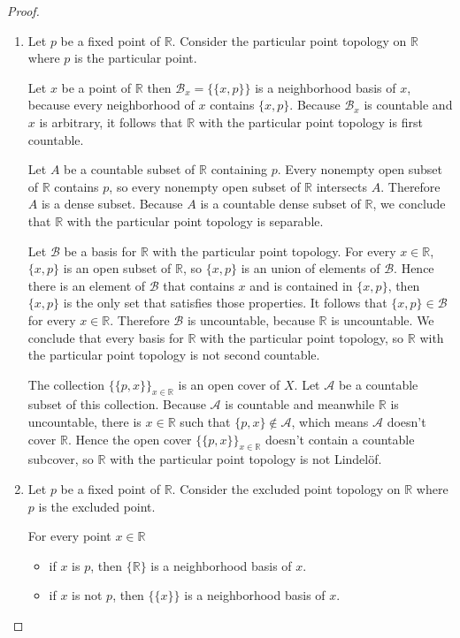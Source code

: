 \begin{proof}
	\begin{enumerate}[label={(\alph*)}]
		\item Let $p$ be a fixed point of $\mathbb{R}$. Consider the particular point topology on $\mathbb{R}$ where $p$ is the particular point.

		      Let $x$ be a point of $\mathbb{R}$ then $\mathscr{B}_{x} = \{ \{ x, p \} \}$ is a neighborhood basis of $x$, because every neighborhood of $x$ contains $\{ x, p \}$. Because $\mathscr{B}_{x}$ is countable and $x$ is arbitrary, it follows that $\mathbb{R}$ with the particular point topology is first countable.

		      Let $A$ be a countable subset of $\mathbb{R}$ containing $p$. Every nonempty open subset of $\mathbb{R}$ contains $p$, so every nonempty open subset of $\mathbb{R}$ intersects $A$. Therefore $A$ is a dense subset. Because $A$ is a countable dense subset of $\mathbb{R}$, we conclude that $\mathbb{R}$ with the particular point topology is separable.

		      Let $\mathscr{B}$ be a basis for $\mathbb{R}$ with the particular point topology. For every $x\in\mathbb{R}$, $\{ x, p \}$ is an open subset of $\mathbb{R}$, so $\{ x, p \}$ is an union of elements of $\mathscr{B}$. Hence there is an element of $\mathscr{B}$ that contains $x$ and is contained in $\{
			      x, p \}$, then $\{ x, p \}$ is the only set that satisfies those properties. It follows that $\{ x, p \}\in\mathscr{B}$ for every $x\in\mathbb{R}$. Therefore $\mathscr{B}$ is uncountable, because $\mathbb{R}$ is uncountable. We conclude that every basis for $\mathbb{R}$ with the particular point topology, so  $\mathbb{R}$ with the particular point topology is not second countable.

		      The collection ${\{ \{ p, x \} \}}_{x\in\mathbb{R}}$ is an open cover of $X$. Let $\mathscr{A}$ be a countable subset of this collection. Because $\mathscr{A}$ is countable and meanwhile $\mathbb{R}$ is uncountable, there is $x\in\mathbb{R}$ such that $\{ p, x \}\notin \mathscr{A}$, which means $\mathscr{A}$ doesn't cover $\mathbb{R}$. Hence the open cover ${\{ \{ p, x \} \}}_{x\in\mathbb{R}}$ doesn't contain a countable subcover, so $\mathbb{R}$ with the particular point topology is not Lindelöf.
		\item Let $p$ be a fixed point of $\mathbb{R}$. Consider the excluded point topology on $\mathbb{R}$ where $p$ is the excluded point.

		      For every point $x\in\mathbb{R}$
		      \begin{itemize}
			      \item if $x$ is $p$, then $\{ \mathbb{R} \}$ is a neighborhood basis of $x$.
			      \item if $x$ is not $p$, then $\{ \{ x \} \}$ is a neighborhood basis of $x$.
		      \end{itemize}


\end{enumerate}
\end{proof}
